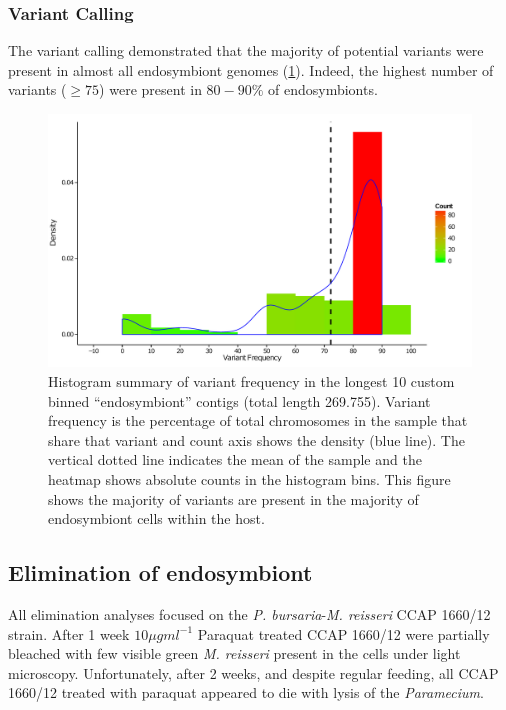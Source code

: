\subsubsection{Variant Calling}

The variant calling demonstrated that the majority of potential
variants were present in almost all endosymbiont genomes (\cref{fig:var_contig}).
Indeed, the highest number of variants (\(\geq 75\)) were present in 
\(80-90\%\) of endosymbionts.

\begin{figure}
    \centering
    \includegraphics[width=\textwidth]{snp_variant_longest_contig.pdf}
    \caption[Endosymbiont variant count and frequency density]{
        Histogram summary of variant frequency in the longest 
        10 custom binned ``endosymbiont'' contigs (total length \SI{269,755}{\bp}).
        Variant frequency is the percentage of total chromosomes
        in the sample that share that variant and count axis shows
        the density (blue line).  The vertical dotted line indicates
        the mean of the sample and the heatmap shows absolute counts
        in the histogram bins. This figure shows the majority
        of variants are present in the majority of endosymbiont
    cells within the host.}
    \label{fig:var_contig}
\end{figure}

\subsection{Elimination of endosymbiont}

All elimination analyses focused on the \textit{P. bursaria}-\textit{M. reisseri}
CCAP 1660/12 strain.
After 1 week \(10\mu g ml^{-1}\) Paraquat treated CCAP 1660/12 were partially bleached
with few visible green \textit{M. reisseri} present in the cells under light
microscopy.
Unfortunately, after 2 weeks, and despite regular feeding, all CCAP 1660/12
treated with paraquat appeared to die with lysis of the \textit{Paramecium}.

